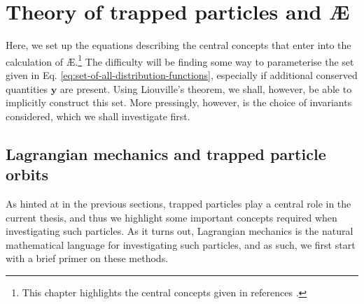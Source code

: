 \chapter[Theory]{Theory of trapped particles and \AE{}}
\label{chap: chapter 2}
Here, we set up the equations describing the central concepts that enter into the calculation of \AE{}.\footnote{This chapter highlights the central concepts given in references \cite{helander2005collisional,helander2014theory,helander2017available,helander2020available}.} The difficulty will be finding some way to parameterise the set given in Eq. \eqref{eq:set-of-all-distribution-functions}, especially if additional conserved quantities $\boldsymbol{y}$ are present. Using Liouville's theorem, we shall, however, be able to implicitly construct this set. More pressingly, however, is the choice of invariants considered, which we shall investigate first.


\section{Lagrangian mechanics and trapped particle orbits}
\label{sec: lagrangian mechanics and trapped particles}
As hinted at in the previous sections, trapped particles play a central role in the current thesis, and thus we highlight some important concepts required when investigating such particles. As it turns out, Lagrangian mechanics is the natural mathematical language for investigating such particles, and as such, we first start with a brief primer on these methods.
